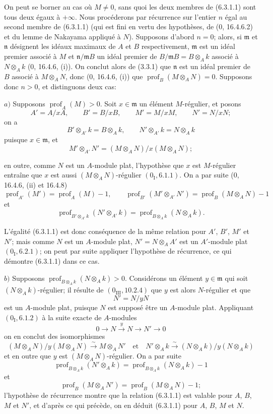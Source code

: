 \documentclass[10pt,oneside]{book}
\newcommand{\oldpage}[2][]{%
  \setcounter{footnote}{0}%
  \marginpar{\scriptsize\textbf{#1}~|~#2}\ignorespaces}
\begin{document}
On peut se borner au cas où $M\neq0$, sans quoi les deux membres de (6.3.1.1)
sont tous deux égaux à $+\infty$. Nous procéderons par récurrence sur l'entier
$n$ égal au second membre de (6.3.1.1) (qui est fini en vertu des hypothèses,
de (0, 16.4.6.2) et du lemme de Nakayama appliqué à $N$). Supposons d'abord
$n=0$; alors, si $\mathfrak m$ et $\mathfrak n$ désignent les idéaux maximaux
de $A$ et $B$ respectivement, $\mathfrak m$ est un idéal premier associé à $M$
et $\mathfrak n/\mathfrak mB$ un idéal premier de
$B/\mathfrak mB=B\otimes_Ak$ associé à $N\otimes_Ak$ (0, 16.4.6, (i)). On
conclut alors de (3.3.1) que $\mathfrak n$ est un idéal premier de $B$ associé
à $M\otimes_AN$, donc (0, 16.4.6, (i)) que
$\operatorname{prof}_B(M\otimes_AN)=0$. Supposons donc $n>0$, et distinguons
deux cas:

$a)$ Supposons $\operatorname{prof}_A(M)>0$. Soit $x\in\mathfrak m$ un
élément $M$-régulier, et posons
\[
A'=A/xA,\qquad B'=B/xB,\qquad M'=M/xM,\qquad N'=N/xN;
\]
on a
\[
B'\otimes_{A'}k=B\otimes_Ak,\qquad N'\otimes_{A'}k=N\otimes_Ak
\]
puisque $x\in\mathfrak m$, et
\[
M'\otimes_{A'}N'=(M\otimes_AN)/x(M\otimes_AN);
\]

\oldpage[IV-2]{139}

en outre, comme $N$ est un $A$-module plat, l'hypothèse que $x$ est
$M$-régulier entraîne que $x$ est aussi $(M\otimes_AN)$-régulier
$(0_{\mathrm I}, 6.1.1)$. On a par suite (0, 16.4.6, (ii) et 16.4.8)
\[
\operatorname{prof}_{A'}(M')=\operatorname{prof}_A(M)-1,
\qquad
\operatorname{prof}_{B'}(M'\otimes_{A'}N')
=\operatorname{prof}_B(M\otimes_AN)-1
\]
et
\[
\operatorname{prof}_{B'\otimes_{A'}k}(N'\otimes_{A'}k)
=\operatorname{prof}_{B\otimes_Ak}(N\otimes_Ak).
\]

L'égalité (6.3.1.1) est donc conséquence de la même relation pour $A'$,
$B'$, $M'$ et $N'$; mais comme $N$ est un $A$-module plat,
$N'=N\otimes_AA'$ est un $A'$-module plat $(0_{\mathrm I}, 6.2.1)$; on peut
par suite appliquer l'hypothèse de récurrence, ce qui démontre (6.3.1.1) dans
ce cas.

$b)$ Supposons $\operatorname{prof}_{B\otimes_Ak}(N\otimes_Ak)>0$.
Considérons un élément $y\in\mathfrak m$ qui soit
$(N\otimes_Ak)$-régulier; il résulte de $(0_{\mathrm{III}}, 10.2.4)$ que $y$
est alors $N$-régulier et que
\[
N'=N/yN
\]
est un $A$-module plat, puisque $N$ est supposé être un $A$-module plat.
Appliquant $(0_{\mathrm I}, 6.1.2)$ à la suite exacte de $A$-modules
\[
0\to N\xrightarrow{y}N\to N'\to0
\]
on en conclut des isomorphismes
\[
(M\otimes_AN)/y(M\otimes_AN)\xrightarrow{\sim}M\otimes_AN'
\quad\text{et}\quad
N'\otimes_Ak\xrightarrow{\sim}(N\otimes_Ak)/y(N\otimes_Ak)
\]
et en outre que $y$ est $(M\otimes_AN)$-régulier. On a par suite
\[
\operatorname{prof}_{B\otimes_Ak}(N'\otimes_Ak)
=\operatorname{prof}_{B\otimes_Ak}(N\otimes_Ak)-1
\]
et
\[
\operatorname{prof}_B(M\otimes_AN')
=\operatorname{prof}_B(M\otimes_AN)-1;
\]
l'hypothèse de récurrence montre que la relation (6.3.1.1) est valable pour
$A$, $B$, $M$ et $N'$, et d'après ce qui précède, on en déduit (6.3.1.1)
pour $A$, $B$, $M$ et $N$.
\end{document}
